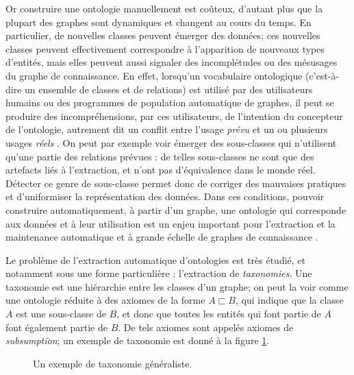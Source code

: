 Or construire une ontologie manuellement est coûteux, d'autant plus que la plupart des graphes sont dynamiques et changent au cours du temps. %
%
En particulier, de nouvelles classes peuvent émerger des données; ces nouvelles classes peuvent effectivement correspondre à l'apparition de nouveaux types d'entités, mais elles peuvent aussi signaler des incomplétudes ou des mésusages du graphe de connaissance.
En effet, lorsqu'un vocabulaire ontologique (c'est-à-dire un ensemble de classes et de relations) est utilisé par des utilisateurs humains ou des programmes de population automatique de graphes, il peut se produire des incompréhensions, par ces utilisateurs, de l'intention du concepteur de l'ontologie, autrement dit un conflit entre l'usage \textit{prévu} et un ou plusieurs usages \textit{réels} \cite{adrian2013inconsistency}. On peut par exemple voir émerger des sous-classes qui n'utilisent qu'une partie des relations prévues : de telles sous-classes ne sont que des artefacts liés à l'extraction, et n'ont pas d'équivalence dans le monde réel. Détecter ce genre de sous-classe permet donc de corriger des mauvaises pratiques et d'uniformiser la représentation des données. %
%
Dans ces conditions, pouvoir construire automatiquement, à partir d'un graphe, une ontologie qui corresponde aux données et à leur utilisation est un enjeu important pour l'extraction et la maintenance automatique et à grande échelle de graphes de connaissance \cite{zhou2007ontology}.

Le problème de l'extraction automatique d'ontologies est très étudié, et notamment sous une forme particulière : l'extraction de \textit{taxonomies}. Une taxonomie est une hiérarchie entre les classes d'un graphe; on peut la voir comme une ontologie réduite à des axiomes de la forme $A \sqsubset B$, qui indique que la classe $A$ est une sous-classe de $B$, et donc que toutes les entités qui font partie de $A$ font également partie de $B$. De tels axiomes sont appelés axiomes de \textit{subsumption}; un exemple de taxonomie est donné à la figure \ref{fig:intro-taxo}.

\begin{figure}[h]
    \centering
    
    \caption{Un exemple de taxonomie généraliste.}
    \label{fig:intro-taxo}
\end{figure}


